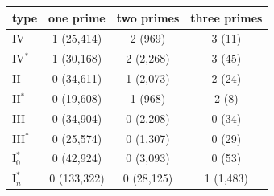 \begin{tabular}{lccc}
\hline
type & one prime & two primes & three primes \\
\hline
IV & 1 (25,414) & 2 (969) & 3 (11) \\
IV$^*$ & 1 (30,168) & 2 (2,268) & 3 (45) \\
II & 0 (34,611) & 1 (2,073) & 2 (24) \\
II$^*$ & 0 (19,608) & 1 (968) & 2 (8) \\
III & 0 (34,904) & 0 (2,208) & 0 (34) \\
III$^*$ & 0 (25,574) & 0 (1,307) & 0 (29) \\
$\mathrm{I}_0^*$ & 0 (42,924) & 0 (3,093) & 0 (53) \\
$\mathrm{I}_n^*$ & 0 (133,322) & 0 (28,125) & 1 (1,483) \\
\hline
\end{tabular}
